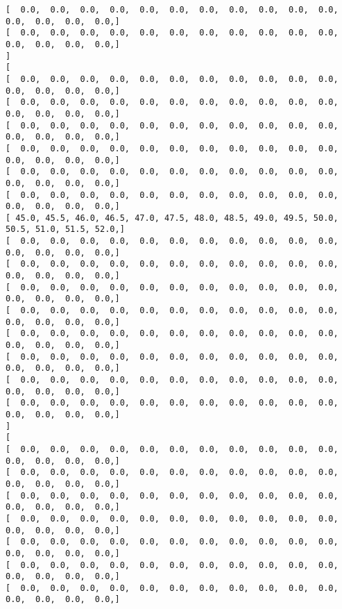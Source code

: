 \documentclass[11pt]{article}
\begin{document}
\begin{Verbatim}[commandchars=\\\{\}]
[   0.0,   0.0,   0.0,   0.0,   0.0,   0.0,   0.0,   0.0,   0.0,   0.0,   0.0,   0.0,   0.0,   0.0,   0.0, ]
[   0.0,   0.0,   0.0,   0.0,   0.0,   0.0,   0.0,   0.0,   0.0,   0.0,   0.0,   0.0,   0.0,   0.0,   0.0, ]
]
[
[   0.0,   0.0,   0.0,   0.0,   0.0,   0.0,   0.0,   0.0,   0.0,   0.0,   0.0,   0.0,   0.0,   0.0,   0.0, ]
[   0.0,   0.0,   0.0,   0.0,   0.0,   0.0,   0.0,   0.0,   0.0,   0.0,   0.0,   0.0,   0.0,   0.0,   0.0, ]
[   0.0,   0.0,   0.0,   0.0,   0.0,   0.0,   0.0,   0.0,   0.0,   0.0,   0.0,   0.0,   0.0,   0.0,   0.0, ]
[   0.0,   0.0,   0.0,   0.0,   0.0,   0.0,   0.0,   0.0,   0.0,   0.0,   0.0,   0.0,   0.0,   0.0,   0.0, ]
[   0.0,   0.0,   0.0,   0.0,   0.0,   0.0,   0.0,   0.0,   0.0,   0.0,   0.0,   0.0,   0.0,   0.0,   0.0, ]
[   0.0,   0.0,   0.0,   0.0,   0.0,   0.0,   0.0,   0.0,   0.0,   0.0,   0.0,   0.0,   0.0,   0.0,   0.0, ]
[  45.0,  45.5,  46.0,  46.5,  47.0,  47.5,  48.0,  48.5,  49.0,  49.5,  50.0,  50.5,  51.0,  51.5,  52.0, ]
[   0.0,   0.0,   0.0,   0.0,   0.0,   0.0,   0.0,   0.0,   0.0,   0.0,   0.0,   0.0,   0.0,   0.0,   0.0, ]
[   0.0,   0.0,   0.0,   0.0,   0.0,   0.0,   0.0,   0.0,   0.0,   0.0,   0.0,   0.0,   0.0,   0.0,   0.0, ]
[   0.0,   0.0,   0.0,   0.0,   0.0,   0.0,   0.0,   0.0,   0.0,   0.0,   0.0,   0.0,   0.0,   0.0,   0.0, ]
[   0.0,   0.0,   0.0,   0.0,   0.0,   0.0,   0.0,   0.0,   0.0,   0.0,   0.0,   0.0,   0.0,   0.0,   0.0, ]
[   0.0,   0.0,   0.0,   0.0,   0.0,   0.0,   0.0,   0.0,   0.0,   0.0,   0.0,   0.0,   0.0,   0.0,   0.0, ]
[   0.0,   0.0,   0.0,   0.0,   0.0,   0.0,   0.0,   0.0,   0.0,   0.0,   0.0,   0.0,   0.0,   0.0,   0.0, ]
[   0.0,   0.0,   0.0,   0.0,   0.0,   0.0,   0.0,   0.0,   0.0,   0.0,   0.0,   0.0,   0.0,   0.0,   0.0, ]
[   0.0,   0.0,   0.0,   0.0,   0.0,   0.0,   0.0,   0.0,   0.0,   0.0,   0.0,   0.0,   0.0,   0.0,   0.0, ]
]
[
[   0.0,   0.0,   0.0,   0.0,   0.0,   0.0,   0.0,   0.0,   0.0,   0.0,   0.0,   0.0,   0.0,   0.0,   0.0, ]
[   0.0,   0.0,   0.0,   0.0,   0.0,   0.0,   0.0,   0.0,   0.0,   0.0,   0.0,   0.0,   0.0,   0.0,   0.0, ]
[   0.0,   0.0,   0.0,   0.0,   0.0,   0.0,   0.0,   0.0,   0.0,   0.0,   0.0,   0.0,   0.0,   0.0,   0.0, ]
[   0.0,   0.0,   0.0,   0.0,   0.0,   0.0,   0.0,   0.0,   0.0,   0.0,   0.0,   0.0,   0.0,   0.0,   0.0, ]
[   0.0,   0.0,   0.0,   0.0,   0.0,   0.0,   0.0,   0.0,   0.0,   0.0,   0.0,   0.0,   0.0,   0.0,   0.0, ]
[   0.0,   0.0,   0.0,   0.0,   0.0,   0.0,   0.0,   0.0,   0.0,   0.0,   0.0,   0.0,   0.0,   0.0,   0.0, ]
[   0.0,   0.0,   0.0,   0.0,   0.0,   0.0,   0.0,   0.0,   0.0,   0.0,   0.0,   0.0,   0.0,   0.0,   0.0, ]

\end{Verbatim}
\end{document}
